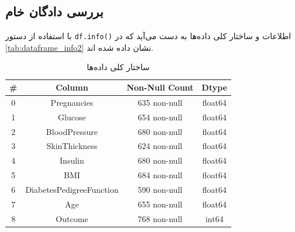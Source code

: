\documentclass[11pt]{article}
\begin{document}
	\subsection{بررسی دادگان خام}
		با استفاده از دستور 
	\verb|df.info()|
	اطلاعات و ساختار کلی داده‌ها به دست می‌آید که در 
	\autoref{tab:dataframe_info2}
	نشان داده شده اند.
	\begin{table}[h!]
		\centering
		\caption{ساختار کلی داده‌ها}
		\begin{latin}
			{\scriptsize
				\begin{tabular}{cccc}
					\toprule
					\# & Column                     & Non-Null Count   & Dtype   \\ 
					\midrule
					0  & Pregnancies                & 635 non-null     & float64 \\ 
					1  & Glucose                    & 654 non-null     & float64 \\ 
					2  & BloodPressure              & 680 non-null     & float64 \\ 
					3  & SkinThickness              & 624 non-null     & float64 \\ 
					4  & Insulin                    & 680 non-null     & float64 \\ 
					5  & BMI                        & 684 non-null     & float64 \\ 
					6  & DiabetesPedigreeFunction   & 590 non-null     & float64 \\ 
					7  & Age                        & 655 non-null     & float64 \\ 
					8  & Outcome                    & 768 non-null     & int64   \\ 
					\bottomrule
				\end{tabular}
			}
		\end{latin}
		\label{tab:dataframe_info2}
	\end{table}
	
\end{document}
